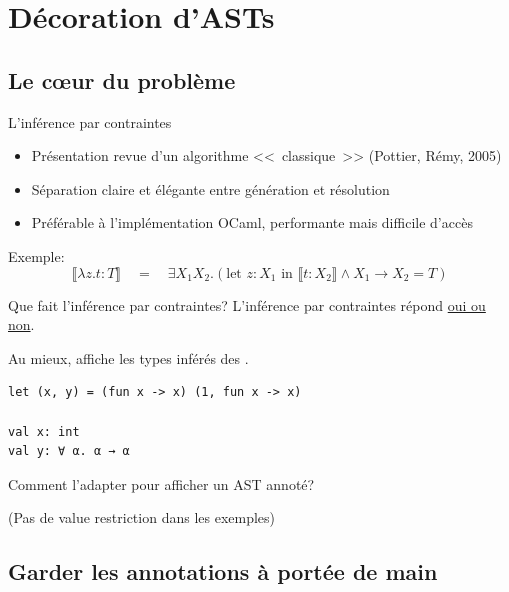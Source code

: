 \documentclass[final]{beamer}
\begin{document}
\section{Décoration d'ASTs}

\subsection{Le cœur du problème}

\begin{frame}{L'inférence par contraintes}
  \begin{itemize}
    \item Présentation revue d'un algorithme <<~classique~>> (Pottier, Rémy, 2005)
    \item Séparation claire et élégante entre génération et résolution
    \item Préférable à l'implémentation OCaml, performante mais difficile
      d'accès
  \end{itemize}
  Exemple: $$
  \llbracket \lambda z.t : T \rrbracket \quad = \quad
  \exists X_1 X_2.\left(\text{let }z: X_1 \text{ in } \llbracket t: X_2
  \rrbracket \wedge X_1 \to X_2 = T\right)
  $$
\end{frame}

\newcommand{\red}[1]{\textcolor[HTML]{F7800A}{#1}}

\begin{frame}[fragile]{Que fait l'inférence par contraintes?}
  L'inférence par contraintes répond \underline{oui ou non}.

  Au mieux, affiche les types inférés des \underline{}.
  \begin{verbatim}
let (x, y) = (fun x -> x) (1, fun x -> x)

val x: int
val y: ∀ α. α → α
  \end{verbatim}

  \red{Comment l'adapter pour afficher un AST annoté?}

  \begin{flushright}
    \footnotesize(Pas de value restriction dans les exemples)
  \end{flushright}
\end{frame}

\subsection{Garder les annotations à portée de main}
\end{document}
